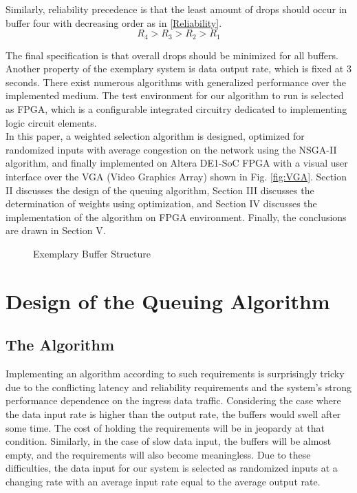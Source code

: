 \documentclass[journal,twoside]{IEEEtran}
\begin{document}
\indent Similarly, reliability precedence is that the least amount of drops should occur in buffer four with decreasing order as in \ref{Reliability}.
\begin{equation}\label{Reliability}
R_{4}  >R_{3}  >R_{2}  >R_{1}
\end{equation}

\indent The final specification is that overall drops should be minimized for all buffers. Another property of the exemplary system is data output rate, which is fixed at 3 seconds. There exist numerous algorithms with generalized performance over the implemented medium. The test environment for our algorithm to run is selected as FPGA, which is a configurable integrated circuitry dedicated to implementing logic circuit elements.\\

\indent In this paper, a weighted selection algorithm is designed, optimized for randomized inputs with average congestion on the network using the NSGA-II algorithm, and finally implemented on Altera DE1-SoC FPGA with a visual user interface over the VGA (Video Graphics Array) shown in Fig. \ref{fig:VGA}. Section II discusses the design of the queuing algorithm, Section III discusses the determination of weights using optimization, and Section IV discusses the implementation of the algorithm on FPGA environment. Finally, the conclusions are drawn in Section V.

\begin{figure}[ht]
    \centering
    
    \captionsetup{justification=centering}
    \caption{Exemplary Buffer Structure}
    \label{fig:buffer}
\end{figure}


\section{Design of the Queuing Algorithm}
\subsection{The Algorithm}
\indent Implementing an algorithm according to such requirements is surprisingly tricky due to the conflicting latency and reliability requirements and the system's strong performance dependence on the ingress data traffic. Considering the case where the data input rate is higher than the output rate, the buffers would swell after some time. The cost of holding the requirements will be in jeopardy at that condition. Similarly, in the case of slow data input, the buffers will be almost empty, and the requirements will also become meaningless. Due to these difficulties, the data input for our system is selected as randomized inputs at a changing rate with an average input rate equal to the average output rate.\\
\end{document}
